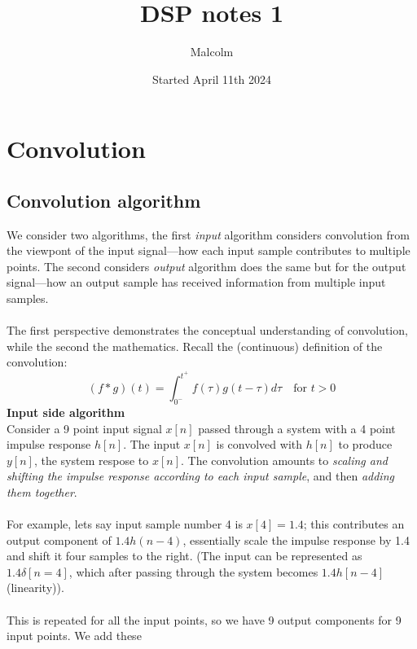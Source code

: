 \documentclass{report}
\title{DSP notes 1}
\date{Started April 11th 2024}
\author{Malcolm}
\begin{document}
\maketitle

\tableofcontents

\newpage
\section{Convolution}
\subsection{Convolution algorithm}
We consider two algorithms, the first \textit{input} algorithm considers convolution from the 
viewpont of the input signal---how each input sample contributes to
multiple points. The second considers \textit{output} algorithm does the same but for the output signal---how 
an output sample has received information from multiple input samples.\\
\vspace{1mm}\\
The first perspective demonstrates the conceptual understanding of convolution, while the second the mathematics.
Recall the (continuous) definition of the convolution:
\begin{equation*}
(f*g)(t)=\int^{t^+}_{0^-}f(\tau)g(t-\tau)d\tau\quad\text{for }t>0
\end{equation*}
\noindent\textbf{Input side algorithm}\\
Consider a 9 point input signal $x[n]$ passed through a system with a 4 point impulse response $h[n]$.  
The input $x[n]$ is convolved
with $h[n]$ to produce $y[n]$, the system respose to $x[n]$. The convolution amounts to 
\textit{scaling and shifting the impulse response according to each input sample}, and then \textit{adding
them together}.\\
\vspace{1mm}\\
For example, lets say input sample number 4 is $x[4]=1.4$; this contributes an output component of $1.4h(n-4)$, 
essentially
scale the impulse response by 1.4 and shift it four samples to the right. (The input can be represented
as $1.4\delta[n=4]$, which after passing through the system becomes $1.4h[n-4]$ (linearity)).\\
\vspace{1mm}\\
This is repeated for all the input points, so we have 9 output components for 9 input points. We add these 
\end{document}
